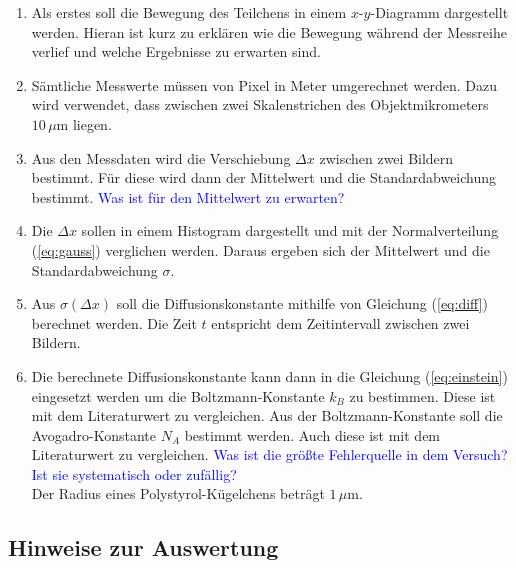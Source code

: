 \begin{enumerate}

  \item Als erstes soll die Bewegung des Teilchens in einem $x$-$y$-Diagramm dargestellt werden. Hieran ist kurz zu erklären wie die Bewegung während der Messreihe verlief und welche Ergebnisse zu erwarten sind.

  \item Sämtliche Messwerte müssen von Pixel in Meter umgerechnet werden. Dazu wird verwendet, dass zwischen zwei Skalenstrichen des Objektmikrometers $10\, \mu$m liegen.

  \item Aus den Messdaten wird die Verschiebung $\Delta x$ zwischen zwei Bildern bestimmt. Für diese wird dann der Mittelwert und die Standardabweichung bestimmt. \textcolor{blue}{Was ist für den Mittelwert zu erwarten?
}
  \item Die $\Delta x$ sollen in einem Histogram dargestellt und mit der Normalverteilung (\ref{eq:gauss}) verglichen werden. Daraus ergeben sich der Mittelwert und die Standardabweichung $\sigma$.

  \item Aus $\sigma(\Delta x)$ soll die Diffusionskonstante mithilfe von Gleichung (\ref{eq:diff}) berechnet werden. Die Zeit $t$ entspricht dem Zeitintervall zwischen zwei Bildern.

  \item Die berechnete Diffusionskonstante kann dann in die Gleichung (\ref{eq:einstein}) eingesetzt werden um die Boltzmann-Konstante $k_B$ zu bestimmen. Diese ist mit dem Literaturwert zu vergleichen. Aus der Boltzmann-Konstante soll die Avogadro-Konstante $N_A$ bestimmt werden. Auch diese ist mit dem Literaturwert zu vergleichen. \textcolor{blue}{Was ist die größte Fehlerquelle in dem Versuch? Ist sie systematisch oder zufällig?}\\
  Der Radius eines Polystyrol-Kügelchens beträgt $1\,\mu$m.

\end{enumerate}


\subsection*{Hinweise zur Auswertung}

